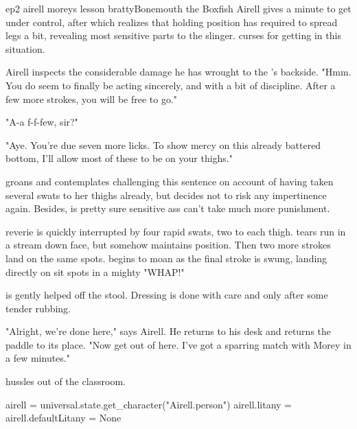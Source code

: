 \documentclass{book}
\begin{document}
\begin{childnode}{ep2 airell moreys lesson bratty}{Bonemouth the Boxfish}
    Airell gives \name{} a minute to get \himselfherself{} under control, after which \heshe{} realizes that holding \hisher{} position has required \himher{} to spread \hisher{} legs a bit,
    revealing \hisher{} most sensitive parts to the slinger. \HeShe{}
    curses \himselfherself{} for getting in this situation.

    Airell inspects the considerable damage he has wrought to the \boygirl{}'s \bumadj{} backside. "Hmm. You do seem to finally be acting sincerely, and with a bit of discipline. After a few 
    more strokes, you will be free to go."

"A-a f-f-few, sir?" 

"Aye. You're due seven more licks. To show mercy on this already battered bottom, I'll allow most of these to be on your thighs."

\name{} groans and contemplates challenging this sentence on account of having taken several swats to her thighs already, but decides not to risk any impertinence again. Besides, \heshe{} is 
pretty sure \hisher{} sensitive ass can't take much more punishment.

\HisHer{} reverie is quickly interrupted by four rapid swats, two to each thigh. \names{} tears run in a stream down \hisher{} face, but \heshe{} somehow maintains \hisher{} position. Then two more 
strokes land on the same spots. \HeShe{} begins to moan as the final stroke is swung, landing directly on \hisher{} sit spots in a mighty "WHAP!"

\name{} is gently helped off the stool. Dressing is done with care and only after some tender rubbing. 

"Alright, we're done here," says Airell. He returns to his desk and returns the paddle to its place. "Now get out of here. I've got a sparring match with Morey in a few minutes."

\name{} hussles out of the classroom. 


\begin{code}

    airell = universal.state.get_character("Airell.person")
    airell.litany = airell.defaultLitany = None

\end{code}

\end{childnode}
\end{document}

